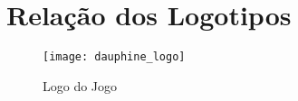 \AddToShipoutPicture{\BackgroundPic}

\section*{Relação dos Logotipos}

	\begin{figure}[htb]
		\hspace{0.45cm}
		\centering
		\texttt{[image: dauphine\_logo]}
		\caption{Logo do Jogo}
	\end{figure}
